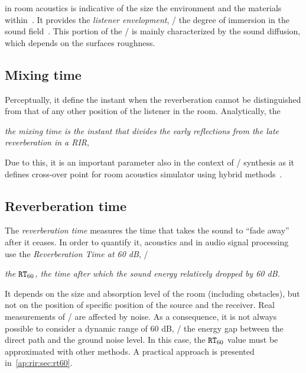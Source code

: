  in room acoustics is indicative of the size the environment and the materials within~.
It provides the \textit{listener envelopment}, \ie/ the degree of immersion in the sound field~.
This portion of the \RIR/ is mainly characterized by the sound diffusion, which depends on the surfaces roughness.

\subsection{Mixing time}
Perceptually, it define the instant when the reverberation cannot be distinguished from that of any other position of the listener in the room.
Analytically,  the
\begin{center}
    \textit{the mixing time is the instant that divides the early reflections from the late reverberation in a RIR},
\end{center}
Due to this, it is an important parameter also in the context of \RIRs/ synthesis as it defines cross-over point for room acoustics simulator using hybrid methods~.

\subsection{Reverberation time}
The \textit{reverberation time} measures the time that takes the sound to ``fade away'' after it ceases.
In order to quantify it, acoustics and in audio signal processing use the \textit{Reverberation Time at 60 dB}, \ie/
\begin{center}
    \textit{the $\mathtt{RT}_{60}$, the time after which the sound energy relatively dropped by 60 dB.}
\end{center}
It depends on the size and absorption level of the room (including obstacles), but not on the position of specific position of the source and the receiver.
Real measurements of \RIRs/ are affected by noise.
As a consequence, it is not always possible to consider a dynamic range of 60 dB,
\ie/ the energy gap between the direct path and the ground noise level.
In this case, the $\mathtt{RT}_{60}$ value must be approximated with other methods.
A practical approach is presented in~\cref{ap:rir:sec:rt60}.

